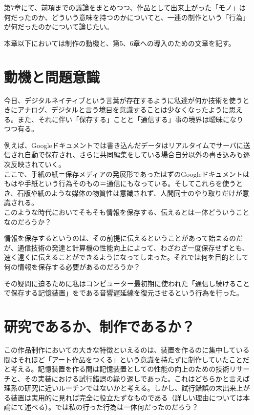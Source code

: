 第7章にて、前項までの議論をまとめつつ、作品として出来上がった「モノ」は何だったのか、どういう意味を持つのかについてと、一連の制作という「行為」が何だったのかについて論じたい。

本章以下においては制作の動機と、第5、6章への導入のための文章を記す。

\section{動機と問題意識}\label{ux52d5ux6a5fux3068ux554fux984cux610fux8b58}

今日、デジタルネイティブという言葉が存在するように私達が何か技術を使うときにアナログ、デジタルと言う境目を意識することは少なくなったように思える。また、それに伴い「保存する」ことと「通信する」事の境界は曖昧になりつつ有る。

例えば、Googleドキュメントでは書き込んだデータはリアルタイムでサーバに送信され自動で保存され、さらに共同編集をしている場合自分以外の書き込みも逐次反映されていく。\\
ここで、手紙の紙＝保存メディアの発展形であったはずのGoogleドキュメントはもはや手紙という行為そのもの＝通信にもなっている。そしてこれらを使うとき、石版や紙のような媒体の物質性は意識されず、人間同士のやり取りだけが意識される。\\
このような時代においてそもそも情報を保存する、伝えるとは一体どういうことなのだろうか？

情報を保存するというのは、その前提に伝えるということがあって始まるのだが、通信技術の発達と計算機の性能向上によって、わざわざ一度保存せずとも、速く遠くに伝えることができるようになってしまった。それでは何を目的として何の情報を保存する必要があるのだろうか？

その疑問に迫るために私はコンピューター最初期に使われた「通信し続けることで保存する記憶装置」をである音響遅延線を復元させるという行為を行った。

\section{研究であるか、制作であるか？}\label{ux7814ux7a76ux3067ux3042ux308bux304bux5236ux4f5cux3067ux3042ux308bux304b}

この作品制作においての大きな特徴といえるのは、装置を作るのに集中している間はそれほど「アート作品をつくる」という意識を持たずに制作していたことだと考える。記憶装置を作る間は記憶装置としての性能の向上のための技術リサーチと、その実装における試行錯誤の繰り返しであった。これはどちらかと言えば理系の研究に近いルーチンではないかと考える。しかし、試行錯誤の末出来上がる装置は実用的に見れば完全に役立たずなものである（詳しい理由については本論にて述べる）。では私の行った行為は一体何だったのだろう？

